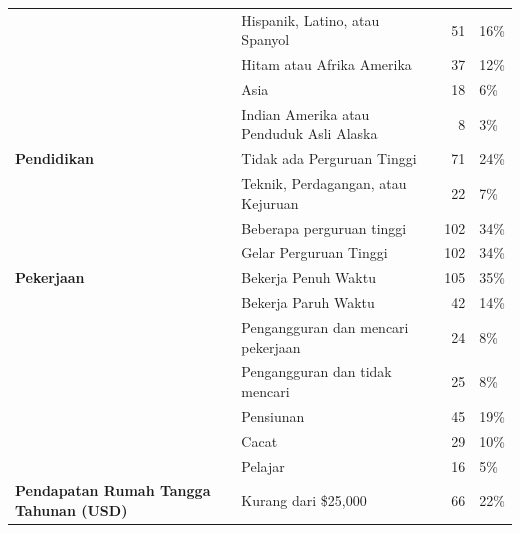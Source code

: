 \documentclass[lettersize,journal]{IEEEtran}
\begin{document}
\begin{table}[h!]
\begin{tabular}{@{}llrl@{}}
                                                   & Hispanik, Latino, atau Spanyol           & 51         & 16\%        \\
                                                   & Hitam atau Afrika Amerika                & 37         & 12\%        \\
                                                   & Asia                                     & 18         & 6\%         \\
                                                   & Indian Amerika atau Penduduk Asli Alaska & 8          & 3\%         \\ \midrule
    \textbf{Pendidikan}                            & Tidak ada Perguruan Tinggi               & 71         & 24\%        \\
                                                   & Teknik, Perdagangan, atau Kejuruan       & 22         & 7\%         \\
                                                   & Beberapa perguruan tinggi                & 102        & 34\%        \\
                                                   & Gelar Perguruan Tinggi                   & 102        & 34\%        \\ \midrule
    \textbf{Pekerjaan}                             & Bekerja Penuh Waktu                      & 105        & 35\%        \\
                                                   & Bekerja Paruh Waktu                      & 42         & 14\%        \\
                                                   & Pengangguran dan mencari pekerjaan       & 24         & 8\%         \\
                                                   & Pengangguran dan tidak mencari           & 25         & 8\%         \\
                                                   & Pensiunan                                & 45         & 19\%        \\
                                                   & Cacat                                    & 29         & 10\%        \\
                                                   & Pelajar                                  & 16         & 5\%         \\ \midrule
    \textbf{Pendapatan Rumah Tangga Tahunan (USD)} & Kurang dari \$25,000                     & 66         & 22\%        \\

\end{tabular}
\end{table}
\end{document}
